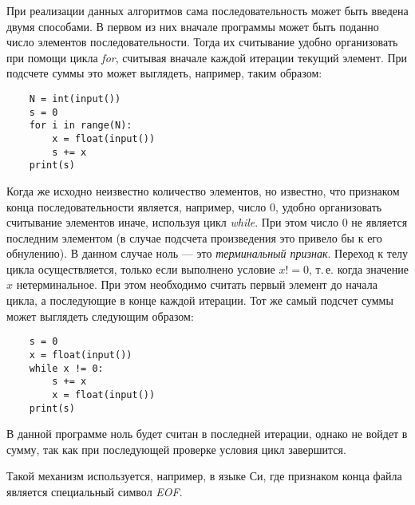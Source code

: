\documentclass[a4paper, fleqn]{article}
\begin{document}
	При реализации данных алгоритмов сама последовательность может быть введена двумя способами. В первом из них вначале программы может быть поданно число элементов последовательности. Тогда их считывание удобно организовать при помощи цикла \emph{for}, считывая вначале каждой итерации текущий элемент. При подсчете суммы это может выглядеть, например, таким образом:
	\begin{lstlisting}
	N = int(input())
	s = 0
	for i in range(N):
		x = float(input())
		s += x
	print(s)
	\end{lstlisting}
		
		
	Когда же исходно неизвестно количество элементов, но известно, что признаком конца последовательности является, например, число $0$, удобно организовать считывание элементов иначе, используя цикл \emph{while}. При этом число $0$ не является последним элементом (в случае  подсчета произведения это  привело бы к его обнулению). В данном случае ноль --- это \emph{терминальный признак}. Переход к телу цикла осуществляется, только если выполнено условие $x != 0$, т.\,е. когда значение $x$ нетерминальное. 
	При этом необходимо считать первый элемент до начала цикла, а  последующие в конце каждой итерации.
	Тот же самый подсчет суммы может выглядеть следующим образом:  
	\begin{lstlisting}
	s = 0
	x = float(input())
	while x != 0:
		s += x
		x = float(input())
	print(s)	
	\end{lstlisting}
	В данной программе ноль будет считан в последней итерации, однако не войдет в сумму, так как при последующей проверке условия цикл завершится. 
	
	Такой механизм используется, например, в языке Си, где признаком конца файла является специальный символ \emph{EOF}. 
	
\end{document}
